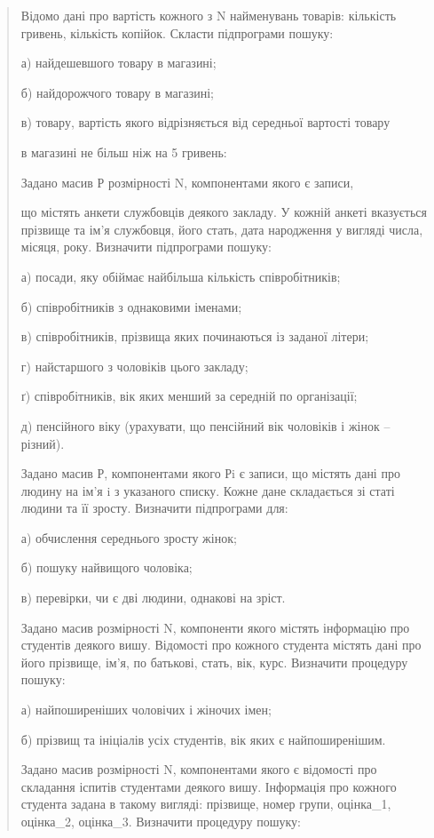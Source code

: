 \documentclass[]{article}
\begin{document}
\begin{quote}
Відомо дані про вартість кожного з N найменувань товарів: кількість
гривень, кількість копійок. Скласти підпрограми пошуку:

а) найдешевшого товару в магазині;

б) найдорожчого товару в магазині;

в) товару, вартість якого відрізняється від середньої вартості товару

в магазині не більш ніж на 5 гривень:

Задано масив Р розмірності N, компонентами якого є записи,

що містять анкети службовців деякого закладу. У кожній анкеті вказується
прізвище та ім'я службовця, його стать, дата народження у вигляді числа,
місяця, року. Визначити підпрограми пошуку:

а) посади, яку обіймає найбільша кількість співробітників;

б) співробітників з однаковими іменами;

в) співробітників, прізвища яких починаються із заданої літери;

г) найстаршого з чоловіків цього закладу;

ґ) співробітників, вік яких менший за середній по організації;

д) пенсійного віку (урахувати, що пенсійний вік чоловіків і жінок --
різний).

Задано масив Р, компонентами якого Рi є записи, що містять дані про
людину на ім'я i з указаного списку. Кожне дане складається зі статі
людини та її зросту. Визначити підпрограми для:

а) обчислення середнього зросту жінок;

б) пошуку найвищого чоловіка;

в) перевірки, чи є дві людини, однакові на зріст.

Задано масив розмірності N, компоненти якого містять інформацію про
студентів деякого вишу. Відомості про кожного студента містять дані про
його прізвище, ім'я, по батькові, стать, вік, курс. Визначити процедуру
пошуку:

а) найпоширеніших чоловічих і жіночих імен;

б) прізвищ та ініціалів усіх студентів, вік яких є найпоширенішим.

Задано масив розмірності N, компонентами якого є відомості про складання
іспитів студентами деякого вишу. Інформація про кожного студента задана
в такому вигляді: прізвище, номер групи, оцінка\_1, оцінка\_2,
оцінка\_3. Визначити процедуру пошуку:


\end{quote}
\end{document}
